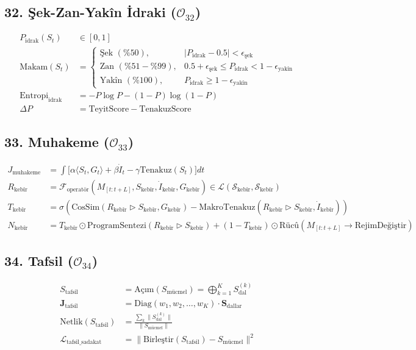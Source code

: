 \documentclass[11pt, a4paper]{article}
\begin{document}
\subsection{32. Şek-Zan-Yakîn İdraki ($\mathcal{O}_{32}$)}
\begin{align}
P_{\text{idrak}}(S_t) &\in [0, 1] \\
\text{Makam}(S_t) &= 
\begin{cases}
\text{Şek } (\%50), & |P_{\text{idrak}} - 0.5| < \epsilon_{\text{şek}} \\
\text{Zan } (\%51-\%99), & 0.5 + \epsilon_{\text{şek}} \le P_{\text{idrak}} < 1 - \epsilon_{\text{yakîn}} \\
\text{Yakîn } (\%100), & P_{\text{idrak}} \ge 1 - \epsilon_{\text{yakîn}}
\end{cases} \\
\text{Entropi}_{\text{idrak}} &= -P \log P - (1-P) \log (1-P) \\
\Delta P &= \text{TeyitScore} - \text{TenakuzScore}
\end{align}

\subsection{33. Muhakeme ($\mathcal{O}_{33}$)}
\begin{align}
J_{\text{muhakeme}} &= \int \Big[ \alpha \langle S_t, G_t \rangle + \beta \dot{I}_t - \gamma \text{Tenakuz}(S_t) \Big] dt \\
R_{\text{kebîr}} &= \mathcal{F}_{\text{operatör}}(M_{[t:t+L]}, S_{\text{kebîr}}, \dot{I}_{\text{kebîr}}, G_{\text{kebîr}}) \in \mathcal{L}(\mathcal{S}_{\text{kebîr}}, \mathcal{S}_{\text{kebîr}}) \\
T_{\text{kebîr}} &= \sigma\left( \text{CosSim}(R_{\text{kebîr}} \triangleright S_{\text{kebîr}}, G_{\text{kebîr}}) - \text{MakroTenakuz}(R_{\text{kebîr}} \triangleright S_{\text{kebîr}}, \dot{I}_{\text{kebîr}}) \right) \\
N_{\text{kebîr}} &= T_{\text{kebîr}} \odot \text{ProgramSentezi}(R_{\text{kebîr}} \triangleright S_{\text{kebîr}}) + (1 - T_{\text{kebîr}}) \odot \text{Rücû}(M_{[t:t+L]} \to \text{RejimDeğiştir})
\end{align}

\subsection{34. Tafsil ($\mathcal{O}_{34}$)}
\begin{align}
S_{\text{tafsil}} &= \text{Açım}(S_{\text{mücmel}}) = \bigoplus_{k=1}^K S_{\text{dal}}^{(k)} \\
\mathbf{J}_{\text{tafsil}} &= \text{Diag}(w_1, w_2, \dots, w_K) \cdot \mathbf{S}_{\text{dallar}} \\
\text{Netlik}(S_{\text{tafsil}}) &= \frac{\sum_k \|S_{\text{dal}}^{(k)}\|}{\|S_{\text{mücmel}}\|} \\
\mathcal{L}_{\text{tafsil\_sadakat}} &= \| \text{Birleştir}(S_{\text{tafsil}}) - S_{\text{mücmel}} \|^2
\end{align}
\end{document}
